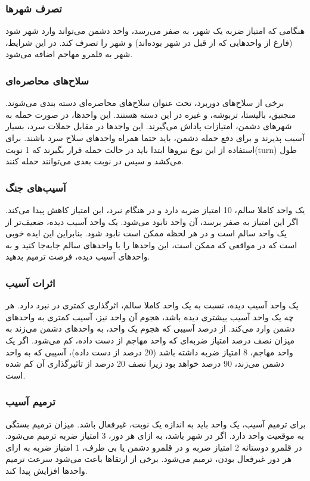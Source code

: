\documentclass[]{article}
\begin{document}
\subsubsection*{{\titr تصرف شهر‌ها}}
هنگامی که امتیاز ضربه یک شهر، به صفر می‌رسد، واحد دشمن می‌تواند وارد شهر شود (فارغ از واحد‌هایی که از قبل در شهر بوده‌اند) و شهر را تصرف کند. در این شرایط، شهر به قلمرو مهاجم اضافه می‌شود.
\subsubsection*{{\titr سلاح‌های محاصره‌ای}}
برخی از سلاح‌های دوربرد، تحت عنوان سلاح‌های محاصره‌ای دسته بندی می‌شوند. منجنیق، بالیستا، تربوشه، و غیره در این دسته هستند. این واحد‌ها، در صورت حمله به شهر‌های دشمن، امتیازات پاداش می‌گیرند. این واجد‌ها در مقابل حملات سرد، بسیار آسیب پذیرند و برای دفع حمله دشمن، باید حتما همراه واحد‌های سلاح سرد باشند. برای استفاده از این نوع نیروها ابتدا باید در حالت حمله قرار بگیرند که 1 نوبت(turn) طول می‌کشد و سپس در نوبت بعدی می‌توانند حمله کنند.
\subsubsection*{{\titr آسیب‌های جنگ}}
یک واحد کاملا سالم، 10 امتیاز ضربه دارد و در هنگام نبرد، این امتیاز کاهش پیدا می‌کند. اگر این امتیاز به صفر برسد، آن واحد نابود می‌شود. یک واحد آسیب دیده، ضعیف‌تر از یک واحد سالم است و در هر لحظه ممکن است نابود شود. بنابراین این ایده خوبی است که در مواقعی که ممکن است، این واحد‌ها را با واحد‌های سالم جا‌به‌جا کنید و به واحد‌های آسیب دیده، فرصت ترمیم بدهید.
\subsubsection*{{\titr اثرات آسیب}}
یک واحد آسیب دیده، نسبت به یک واحد کاملا سالم، اثرگذاری کمتری در نبرد دارد. هر چه یک واحد آسیب بیشتری دیده باشد، هجوم آن واحد نیز، آسیب کمتری به واحد‌های دشمن وارد می‌کند. از درصد آسیبی که هجوم یک واحد، به واحد‌های دشمن می‌زند به میزان نصف درصد امتیاز ضربه‌ای که واحد مهاجم از دست داده، کم می‌شود. اگر یک واحد مهاجم، 8 امتیاز ضربه داشته باشد (20 درصد از دست داده)، آسیبی که به واحد دشمن می‌زند، 90 درصد خواهد بود زیرا نصف 20 درصد از تاثیرگذاری آن کم شده است.
\subsubsection*{{\titr ترمیم آسیب}}
برای ترمیم آسیب، یک واحد باید به اندازه یک نوبت، غیرفعال باشد. میزان ترمیم بستگی به موقعیت واحد دارد. اگر در شهر باشد، به ازای هر دور، 3 امتیاز ضربه ترمیم می‌شود. در قلمرو دوستانه 2 امتیاز ضربه و در قلمرو دشمن یا بی طرف، 1 امتیاز ضربه به ازای هر دور غیرفعال بودن، ترمیم می‌شود. برخی از ارتقا‌ها باعث می‌شود سرعت ترمیم واحد‌ها افزایش پیدا کند.
\end{document}
